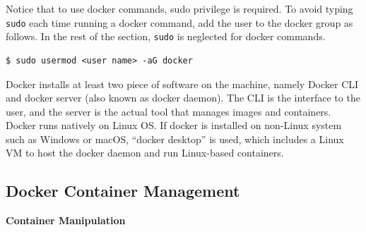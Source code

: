 Notice that to use docker commands, sudo privilege is required. To avoid typing \verb|sudo| each time running a docker command, add the user to the docker group as follows. In the rest of the section, \verb|sudo| is neglected for docker commands.
\begin{lstlisting}
$ sudo usermod <user name> -aG docker
\end{lstlisting}

Docker installs at least two piece of software on the machine, namely Docker CLI and docker server (also known as docker daemon). The CLI is the interface to the user, and the server is the actual tool that manages images and containers. Docker runs natively on Linux OS. If docker is installed on non-Linux system such as Windows or macOS, ``docker desktop'' is used, which includes a Linux VM to host the docker daemon and run Linux-based containers.

\subsection{Docker Container Management}

\vspace{0.1in}
\noindent \textbf{Container Manipulation}
\vspace{0.1in}

